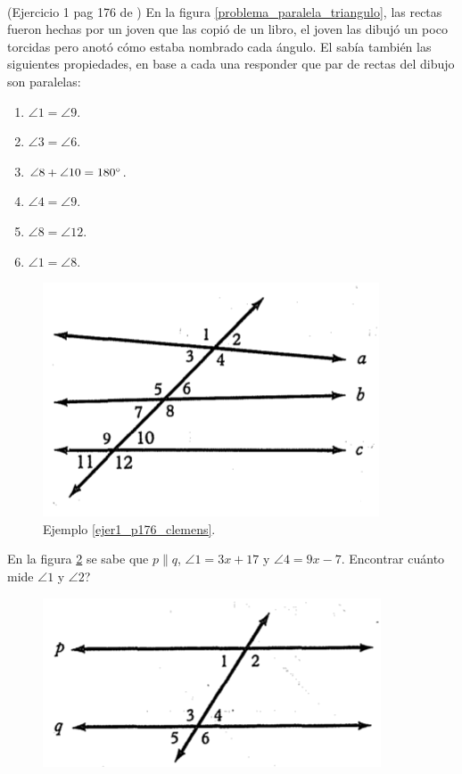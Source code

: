 \begin{ejemplo}{\ \\}
	\label{ejer1_p176_clemens} (Ejercicio 1 pag 176 de \cite{clemens}) En la figura \ref{problema_paralela_triangulo}, las rectas fueron hechas por un joven que las copió de un libro, el joven las dibujó un poco torcidas pero anotó cómo estaba nombrado cada ángulo. El sabía también las siguientes propiedades, en base a cada una responder que par de rectas del dibujo son paralelas:
	\begin{enumerate}[label=\Alph*) ]
		\item $\angle 1 = \angle 9$.
		\item $\angle 3 = \angle 6$.
		\item $\angle 8 + \angle 10 = 180\degree$.
		\item $\angle 4 = \angle 9$.	
		\item $\angle 8 = \angle 12$.			
		\item $\angle 1 = \angle 8$.
	\end{enumerate}
	
	\begin{figure}[H]
		\centering
		\includegraphics[width=0.6\linewidth]{Geometria/imgs/clemens_pag176_ejer1}
		\caption{Ejemplo \ref{ejer1_p176_clemens}.}
		\label{clemens_pag176_ejer1}
	\end{figure}
\end{ejemplo}

\begin{ejemplo}
	\item  En la figura \ref{ejemplo_algebraico_angulos} se sabe que $p\parallel q$, $\angle 1 =3x+17$ y $\angle 4 = 9x-7$. Encontrar cuánto mide $\angle 1$ y $\angle 2$?
	\begin{figure}[H]
		\centering
		\includegraphics[width=0.4\linewidth]{Geometria/imgs/clemens187_24to25}
		\label{ejemplo_algebraico_angulos}
	\end{figure}
\end{ejemplo}

